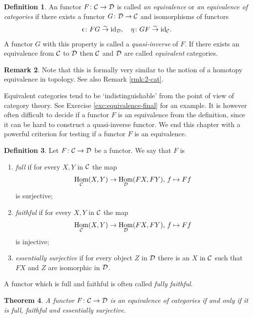 \documentclass[11pt]{amsbook}
\newcommand{\isomto}{\overset{\sim}{\to}}
\DeclareMathOperator\Hom{Hom}
\def\id{{\rm id}}
\theoremstyle{plain}
\newtheorem{theorem}{Theorem}
\theoremstyle{definition}
\newtheorem{definition}[theorem]{Definition}
\newtheorem{remark}[theorem]{Remark}
\begin{document}
\begin{definition}
An functor $F\colon {\mathcal{C}} \to {\mathcal{D}}$ is called \emph{an equivalence} or \emph{an equivalence of categories} if there exists a functor $G\colon {\mathcal{D}} \to {\mathcal{C}}$ and isomorphisms of functors
\[
	\epsilon\colon FG \isomto \id_\cD,\quad \eta\colon GF\isomto \id_\cC.
\]
A functor $G$ with this property is called a \emph{quasi-inverse} of $F$. If there exists an equivalence from ${\mathcal{C}}$ to ${\mathcal{D}}$ then ${\mathcal{C}}$ and ${\mathcal{D}}$ are called \emph{equivalent} categories.
\end{definition}

\begin{remark}
Note that this is formally very similar to the notion of a homotopy equivalence in topology. See also Remark \ref{rmk:2-cat}.
\end{remark}

Equivalent categories tend to be `indistinguishable' from the point of view of category theory. See Exercise \ref{exc:equivalence-final} for an example. It is however often difficult to decide if a functor $F$ is an equivalence from the definition, since it can be hard to construct a quasi-inverse functor. We end this chapter with a powerful criterion for testing if a functor $F$ is an equivalence.

\begin{definition}
Let $F\colon {\mathcal{C}} \to {\mathcal{D}}$ be a functor. We say that $F$ is
\begin{enumerate}
\item \emph{full} if for every $X,Y$ in ${\mathcal{C}}$ the map
\[
	\Hom_\cC(X,Y) \to \Hom_\cD(FX,FY),\, f \mapsto Ff
\]
 is surjective;
\item \emph{faithful} if for every $X,Y$ in ${\mathcal{C}}$ the map
\[
	\Hom_\cC(X,Y) \to \Hom_\cD(FX,FY),\, f \mapsto Ff
\]
is injective;
\item \emph{essentially surjective} if for every object $Z$ in ${\mathcal{D}}$ there is an $X$ in ${\mathcal{C}}$ such that $FX$ and $Z$ are isomorphic in ${\mathcal{D}}$.
\end{enumerate}
A functor which is full and faithful is often called \emph{fully faithful}.
\end{definition}



\begin{theorem}\label{thm:equivalence-of-categories}
A functor $F\colon {\mathcal{C}} \to {\mathcal{D}}$ is an equivalence of categories if and only if it is full, faithful and essentially surjective.
\end{theorem}
\end{document}
